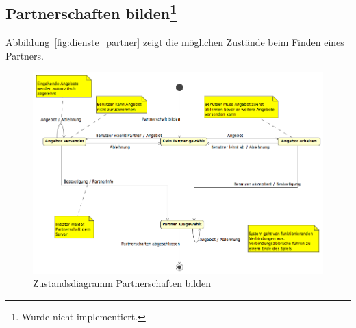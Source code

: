 \documentclass[12pt,halfparskip]{scrartcl}
\begin{document}
\clearpage

\subsection[Partnerschaften bilden]{Partnerschaften bilden\footnote{Wurde nicht implementiert.}}
\label{sub:partnerschaften_bilden}

Abbildung~\vref{fig:dienste_partner} zeigt die möglichen Zustände beim Finden eines Partners.
\begin{figure}[h]
	\centering
	\includegraphics[width=\textwidth]{dienste_partner}
	\caption{Zustandsdiagramm Partnerschaften bilden}
	\label{fig:dienste_partner}
\end{figure}
\end{document}
